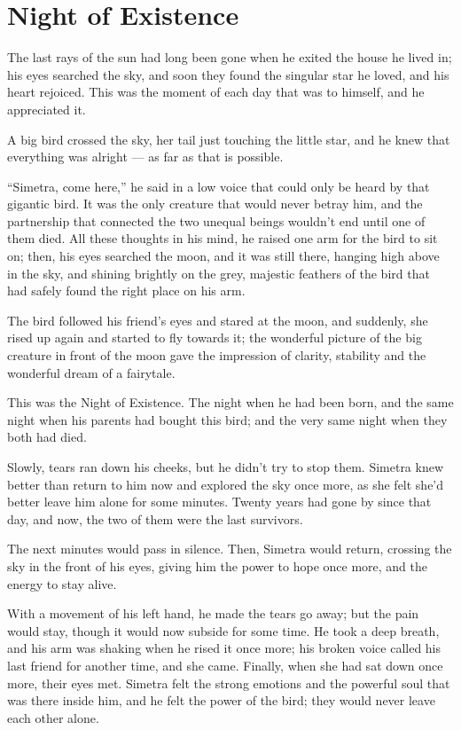 \chapter{Night of Existence}
\label{cha:night-existence}
The last rays of the sun had long been gone when he exited the house he lived in; his eyes searched the sky, and soon they found the singular star he loved, and his heart rejoiced. This was the moment of each day that was to himself, and he appreciated it.

A big bird crossed the sky, her tail just touching the little star, and he knew that everything was alright --- as far as that is possible.

\enquote{Simetra, come here,} he said in a low voice that could only be heard by that gigantic bird. It was the only creature that would never betray him, and the partnership that connected the two unequal beings wouldn't end until one of them died. All these thoughts in his mind, he raised one arm for the bird to sit on; then, his eyes searched the moon, and it was still there, hanging high above in the sky, and shining brightly on the grey, majestic feathers of the bird that had safely found the right place on his arm.

The bird followed his friend's eyes and stared at the moon, and suddenly, she rised up again and started to fly towards it; the wonderful picture of the big creature in front of the moon gave the impression of clarity, stability and the wonderful dream of a fairytale.

This was the Night of Existence. The night when he had been born, and the same night when his parents had bought this bird; and the very same night when they both had died.

Slowly, tears ran down his cheeks, but he didn't try to stop them. Simetra knew better than return to him now and explored the sky once more, as she felt she'd better leave him alone for some minutes. Twenty years had gone by since that day, and now, the two of them were the last survivors.

The next minutes would pass in silence. Then, Simetra would return, crossing the sky in the front of his eyes, giving him the power to hope once more, and the energy to stay alive.

With a movement of his left hand, he made the tears go away; but the pain would stay, though it would now subside for some time. He took a deep breath, and his arm was shaking when he rised it once more; his broken voice called his last friend for another time, and she came. Finally, when she had sat down once more, their eyes met. Simetra felt the strong emotions and the powerful soul that was there inside him, and he felt the power of the bird; they would never leave each other alone.

